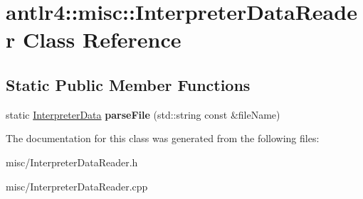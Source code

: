 \hypertarget{classantlr4_1_1misc_1_1InterpreterDataReader}{}\section{antlr4\+:\+:misc\+:\+:Interpreter\+Data\+Reader Class Reference}
\label{classantlr4_1_1misc_1_1InterpreterDataReader}
\subsection*{Static Public Member Functions}
\begin{DoxyCompactItemize}
\item 
\mbox{\label{classantlr4_1_1misc_1_1InterpreterDataReader_a99e1cefa7cbffc9183c787d33524f065}} 
static \hyperlink{structantlr4_1_1misc_1_1InterpreterData}{Interpreter\+Data} {\bfseries parse\+File} (std\+::string const \&file\+Name)
\end{DoxyCompactItemize}


The documentation for this class was generated from the following files\+:\begin{DoxyCompactItemize}
\item 
misc/Interpreter\+Data\+Reader.\+h\item 
misc/Interpreter\+Data\+Reader.\+cpp\end{DoxyCompactItemize}
